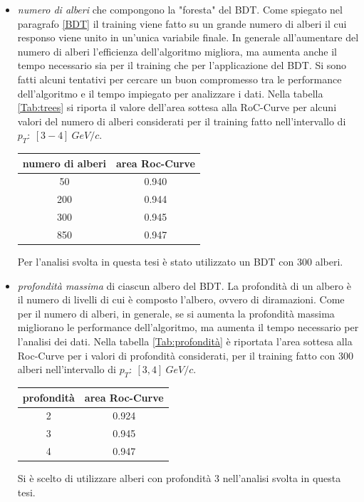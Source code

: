     \begin{itemize}
        \item \textit{numero di alberi} che compongono la "foresta" del BDT. Come spiegato nel paragrafo \ref{BDT}  il training viene fatto su un grande numero di alberi il cui responso viene unito in un'unica variabile finale. In generale all'aumentare del numero di alberi l'efficienza dell'algoritmo migliora, ma aumenta anche il tempo necessario sia per il training che per l'applicazione del BDT. Si sono fatti alcuni tentativi per cercare un buon compromesso tra le performance dell'algoritmo e il tempo impiegato per analizzare i dati.  Nella tabella \ref{Tab:trees} si riporta il valore dell'area sottesa alla RoC-Curve per alcuni valori del numero di alberi considerati per il training fatto nell'intervallo di $p_T: \  [3-4] \ GeV/c$.
       
        \begin{table}[H]
		\centering
		\begin{tabular}{c|c}
		    \toprule
		    numero di alberi  &  area Roc-Curve  \\
            \midrule
              50 &   0.940 \\ 
           	 200 &   0.944  \\ 
             300 &   0.945 \\
             850 &   0.947 \\ 
			\bottomrule
		\end{tabular}
	\end{table}
	
	Per l'analisi svolta in questa tesi è stato utilizzato un BDT con 300 alberi.
	
	\item \textit{profondità massima} di ciascun albero del BDT. La profondità di un albero è il numero di livelli di cui è composto l'albero, ovvero di diramazioni. Come per il numero di alberi, in generale, se si aumenta la profondità massima migliorano le performance dell'algoritmo, ma aumenta il tempo necessario per l'analisi dei dati.
	Nella tabella \ref{Tab:profondità} è riportata l'area sottesa alla Roc-Curve per i valori di profondità considerati, per il training fatto con 300 alberi nell'intervallo di $p_T: \ [3,4] \ GeV/c$.
	
	\begin{table}[H]
		\centering
		\begin{tabular}{c|c}
		    \toprule
		    profondità  &  area Roc-Curve  \\
            \midrule
           	 2 &   0.924  \\ 
             3 &   0.945 \\
             4 &   0.947 \\ 
			\bottomrule
		\end{tabular}
	\end{table}
	Si è scelto di utilizzare alberi con profondità 3 nell'analisi svolta in questa tesi.
    \end{itemize}

